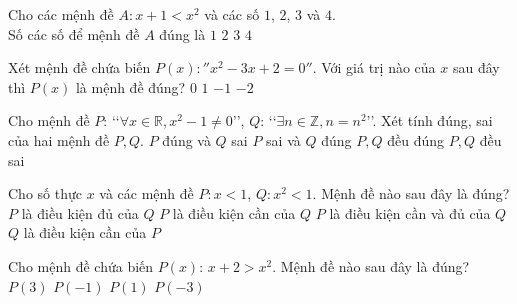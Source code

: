 \begin{ex}%
	Cho các mệnh đề $A\colon x+1<x^2$ và các số $1$,  $2$, $3$ và $4$.\\
	Số  các số để mệnh đề $A$ đúng là
	 \choice
		{$1$} 
		{$2$} 
		 {\True $3$}
		 {$4$}
\end{ex}

\begin{ex}%
	Xét mệnh đề chứa biến $P(x) \colon ''x^2-3x+2=0''$.  Với giá trị nào của $x$ sau đây thì $P(x)$ là mệnh đề đúng?
	\choice 
		 {$0$}
		{\True $1$} 
		{$-1$} 
		{$-2$} 
\end{ex}

\begin{ex}%
	Cho mệnh đề $P$: \lq\lq$\forall x\in \mathbb{R}, x^2-1\ne 0$\rq\rq, $Q$: \lq\lq $\exists n\in \mathbb{Z}, n=n^2$\rq\rq. Xét tính đúng, sai của hai  mệnh đề $P, Q$.
	 \choice
		{$P  $ đúng và $Q$ sai}
		{\True $P $ sai và $Q$ đúng} 
		 {$P, Q $ đều đúng}
		{$P, Q  $ đều sai}
\end{ex}

\begin{ex}%
	Cho số thực $x$ và các mệnh đề $P\colon x<1$, $Q\colon x^2<1$.  Mệnh đề nào sau đây là đúng?
	 \choice
		{$P$ là điều kiện  đủ của $Q$}
		 {\True $P$ là điều kiện cần của $Q$}
		{$P$ là điều kiện  cần và đủ của $Q$}
		{$Q$ là điều kiện cần của $P$} 
\end{ex}

\begin{ex}%
	Cho mệnh đề chứa biến $P(x)$:  $x+2>x^2$. Mệnh đề nào sau đây là đúng?
	\choice 
		{$P(3)$} 
		 {$P(-1)$}
		{\True  $P(1)$}
		{$P(-3)$} 
\end{ex}

